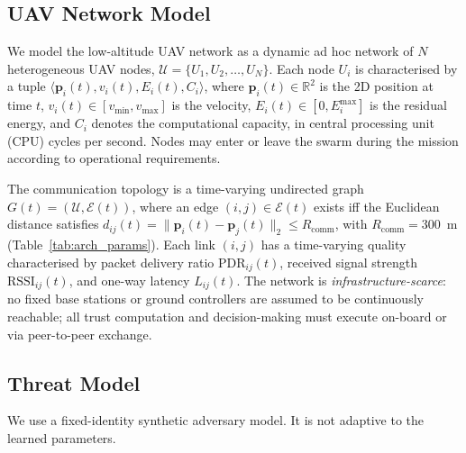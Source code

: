 \documentclass[notspecified,article,submit,moreauthors]{Definitions/mdpi}
\begin{document}
\subsection{UAV Network Model}
\label{sec:net_model}
We model the low-altitude UAV network as a dynamic ad hoc network of $N$ heterogeneous UAV nodes, $\mathcal{U} = \{U_1, U_2, \dots, U_N\}$. Each node $U_i$ is characterised by a tuple $\langle \mathbf{p}_i(t), v_i(t), E_i(t), C_i \rangle$, where $\mathbf{p}_i(t) \in \mathbb{R}^2$ is the 2D position at time $t$, $v_i(t) \in [v_{\min}, v_{\max}]$ is the velocity, $E_i(t) \in [0, E_i^{\max}]$ is the residual energy, and $C_i$ denotes the computational capacity, in central processing unit (CPU) cycles per second. Nodes may enter or leave the swarm during the mission according to operational requirements.

The communication topology is a time-varying undirected graph $G(t) = (\mathcal{U}, \mathcal{E}(t))$, where an edge $(i,j) \in \mathcal{E}(t)$ exists iff the Euclidean distance satisfies $d_{ij}(t) = \|\mathbf{p}_i(t) - \mathbf{p}_j(t)\|_2 \leq R_{\text{comm}}$, with $R_{\text{comm}} = 300$~m (Table~\ref{tab:arch_params}). Each link $(i,j)$ has a time-varying quality characterised by packet delivery ratio $\text{PDR}_{ij}(t)$, received signal strength $\text{RSSI}_{ij}(t)$, and one-way latency $L_{ij}(t)$. The network is \emph{infrastructure-scarce}: no fixed base stations or ground controllers are assumed to be continuously reachable; all trust computation and decision-making must execute on-board or via peer-to-peer exchange.

\subsection{Threat Model}
\label{sec:threat_model}
We use a fixed-identity synthetic adversary model. It is not adaptive to the learned parameters.
\end{document}
